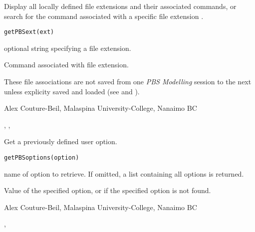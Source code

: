\documentclass[letterpaper]{book}
\begin{document}
\begin{Description}\relax
Display all locally defined file extensions and their associated commands, 
or search for the command associated with a specific file extension
.
\end{Description}
\begin{Usage}
\begin{verbatim}getPBSext(ext)\end{verbatim}
\end{Usage}
\begin{Arguments}
\begin{ldescription}
\item[\code{ext}] optional string specifying a file extension.
\end{ldescription}
\end{Arguments}
\begin{Value}
Command associated with file extension.
\end{Value}
\begin{Note}\relax
These file associations are not saved from one \emph{PBS Modelling} session to
the next unless explicity saved and loaded (see  and
).
\end{Note}
\begin{Author}\relax
Alex Couture-Beil, Malaspina University-College, Nanaimo BC
\end{Author}
\begin{SeeAlso}\relax
{}, , 
\end{SeeAlso}

\begin{Description}\relax
Get a previously defined user option.
\end{Description}
\begin{Usage}
\begin{verbatim}
getPBSoptions(option)
\end{verbatim}
\end{Usage}
\begin{Arguments}
\begin{ldescription}
\item[\code{option}] name of option to retrieve. If omitted, a list containing all options is returned.
\end{ldescription}
\end{Arguments}
\begin{Value}
Value of the specified option, or  if the specified option is not found.
\end{Value}
\begin{Author}\relax
Alex Couture-Beil, Malaspina University-College, Nanaimo BC
\end{Author}
\begin{SeeAlso}\relax
{}, 
\end{SeeAlso}
\end{document}
